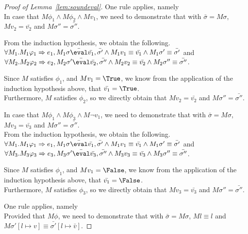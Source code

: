 \begin{proof}[Proof of Lemma~\ref{lem:soundeval}]
   {One rule applies, namely \\

   In case that $M\phi_1\land M\phi_2 \land Mv_1$,
   we need to demonstrate that
    with $\bar{\sigma}=M\sigma$,
   $M v_2 = \bar{v_2}$ and $M\sigma''=\bar{\sigma''}$.

   From the induction hypothesis, we obtain the following.\\
   $\forall M_1 . M_1\phi_1 \implies e_1,M_1\sigma\bar{\eval}\bar{v_1},\bar{\sigma'}
   \land M_1v_1 \equiv \bar{v_1} \land M_1\sigma'\equiv\bar{\sigma'}$
   and\\
   $\forall M_2 . M_2\phi_2 \implies e_2,M_2\sigma'\bar{\eval}\bar{v_2},\bar{\sigma''}
   \land M_2 v_2 \equiv \bar{v_2} \land M_2\sigma'' \equiv\bar{\sigma''}$.

   Since $M$ satisfies $\phi_1$, and $M v_1=\True$, we know from the application of the induction hypothesis above, that $\bar{v_1}=\True$.\\
   Furthermore, $M$ satisfies $\phi_2$, so we directly obtain that $Mv_2=\bar{v_2}$ and $M\sigma''=\bar{\sigma''}$.

   In case that $M\phi_1\land M\phi_3 \land M\neg v_1$,
   we need to demonstrate that
    with $\bar{\sigma}=M\sigma$,
   $M v_3 = \bar{v_3}$ and $M\sigma''=\bar{\sigma''}$.\\

   From the induction hypothesis, we obtain the following.\\
   $\forall M_1 . M_1\phi_1 \implies e_1,M_1\sigma\bar{\eval}\bar{v_1},\bar{\sigma'}
   \land M_1v_1 \equiv \bar{v_1} \land M_1\sigma'\equiv\bar{\sigma'}$
   and\\
   $\forall M_3 . M_3\phi_3 \implies e_3,M_3\sigma'\bar{\eval}\bar{v_3},\bar{\sigma''}
   \land M_3 v_3 \equiv \bar{v_3} \land M_3\sigma'' \equiv\bar{\sigma''}$.

   Since $M$ satisfies $\phi_1$, and $M v_1=\False$, we know from the application of the induction hypothesis above, that $\bar{v_1}=\False$.\\
   Furthermore, $M$ satisfies $\phi_3$, so we directly obtain that $Mv_3=\bar{v_3}$ and $M\sigma''=\bar{\sigma''}$.
  }

  {One rule applies, namely \\
  Provided that $M\phi$,
  we need to demonstrate that  with $\bar{\sigma}=M\sigma$,
  $M l \equiv l$ and $M\sigma'[l\mapsto v]\equiv\bar{\sigma'}[l\mapsto\bar{v}]$.

}
\end{proof}
